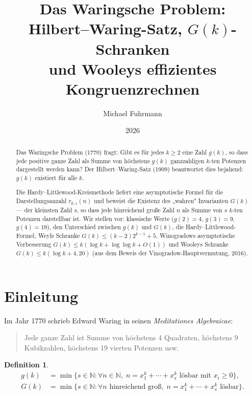 \documentclass[12pt,a4paper]{amsart}
\theoremstyle{definition}
\newtheorem{definition}[theorem]{Definition}
\newcommand{\N}{\mathbb{N}}
\begin{document}
\title{Das Waringsche Problem:\\
       Hilbert--Waring-Satz, $G(k)$-Schranken\\
       und Wooleys effizientes Kongruenzrechnen}

\author{Michael Fuhrmann}
\address{Specialist Mathematics Project, Build 80}
\date{2026}

\begin{abstract}
Das Waringsche Problem (1770) fragt: Gibt es für jedes $k \geq 2$ eine Zahl
$g(k)$, so dass jede positive ganze Zahl als Summe von höchstens $g(k)$
ganzzahligen $k$-ten Potenzen dargestellt werden kann?  Der Hilbert--Waring-Satz
(1909) beantwortet dies bejahend: $g(k)$ existiert für alle $k$.

Die Hardy--Littlewood-Kreismethode liefert eine asymptotische Formel für
die Darstellungsanzahl $r_{k,s}(n)$ und beweist die Existenz des „wahren"
Invarianten $G(k)$ — der kleinsten Zahl $s$, so dass jede hinreichend
große Zahl $n$ als Summe von $s$ $k$-ten Potenzen darstellbar ist.
Wir stellen vor: klassische Werte ($g(2)=4$, $g(3)=9$, $g(4)=19$),
den Unterschied zwischen $g(k)$ und $G(k)$, die Hardy--Littlewood-Formel,
Weyls Schranke $G(k) \leq (k-2)2^{k-1}+5$, Winogradows asymptotische Verbesserung
$G(k) \leq k(\log k + \log\log k + O(1))$ und Wooleys Schranke $G(k) \leq k(\log k + 4{,}20)$
(aus dem Beweis der Vinogradow-Hauptvermutung, 2016).
\end{abstract}

\maketitle
\tableofcontents

\section{Einleitung}

Im Jahr 1770 schrieb Edward Waring in seinen \emph{Meditationes Algebraicae}:
\begin{quote}
  Jede ganze Zahl ist Summe von höchstens 4 Quadraten, höchstens 9 Kubikzahlen,
  höchstens 19 vierten Potenzen usw.
\end{quote}

\begin{definition}
  \begin{align*}
    g(k) &= \min\bigl\{s \in \N : \forall n \in \N,\;
              n = x_1^k + \cdots + x_s^k \text{ lösbar mit } x_i \geq 0\bigr\}, \\
    G(k) &= \min\bigl\{s \in \N : \forall n \text{ hinreichend groß},\;
              n = x_1^k + \cdots + x_s^k \text{ lösbar}\bigr\}.
  \end{align*}
\end{definition}
\end{document}
